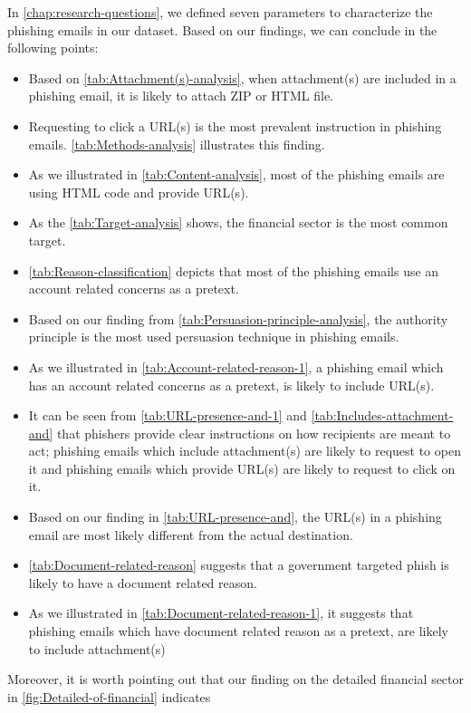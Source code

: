 In \autoref{chap:research-questions}, we defined seven parameters
to characterize the phishing emails in our dataset. Based on our findings,
we can conclude in the following points:
\begin{itemize}
\item Based on \autoref{tab:Attachment(s)-analysis}, when attachment(s)
are included in a phishing email, it is likely to attach ZIP or HTML
file.
\item Requesting to click a URL(s) is the most prevalent instruction in
phishing emails. \autoref{tab:Methods-analysis} illustrates this
finding.
\item As we illustrated in \autoref{tab:Content-analysis}, most of the
phishing emails are using HTML code and provide URL(s). 
\item As the \autoref{tab:Target-analysis} shows, the financial sector
is the most common target.
\item \autoref{tab:Reason-classification} depicts that most of the phishing
emails use an account related concerns as a pretext.
\item Based on our finding from \autoref{tab:Persuasion-principle-analysis},
the authority principle is the most used persuasion technique in phishing
emails.
\item As we illustrated in \autoref{tab:Account-related-reason-1}, a phishing
email which has an account related concerns as a pretext, is likely
to include URL(s).
\item It can be seen from \autoref{tab:URL-presence-and-1} and \autoref{tab:Includes-attachment-and}
that phishers provide clear instructions on how recipients are meant
to act; phishing emails which include attachment(s) are likely to
request to open it and phishing emails which provide URL(s) are likely
to request to click on it. 
\item Based on our finding in \autoref{tab:URL-presence-and}, the URL(s)
in a phishing email are most likely different from the actual destination.
\item \autoref{tab:Document-related-reason} suggests that a government
targeted phish is likely to have a document related reason.
\item As we illustrated in \autoref{tab:Document-related-reason-1}, it
suggests that phishing emails which have document related reason as
a pretext, are likely to include attachment(s)
\end{itemize}
Moreover, it is worth pointing out that our finding on the detailed
financial sector in \autoref{fig:Detailed-of-financial} indicates
